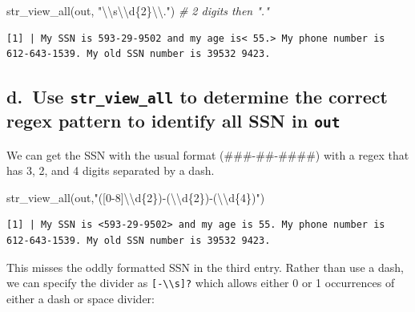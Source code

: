 \documentclass[
]{book}
\newenvironment{Shaded}{\begin{snugshade}}{\end{snugshade}}
\newcommand{\CommentTok}[1]{\textcolor[rgb]{0.56,0.35,0.01}{\textit{#1}}}
\newcommand{\FunctionTok}[1]{\textcolor[rgb]{0.00,0.00,0.00}{#1}}
\newcommand{\NormalTok}[1]{#1}
\newcommand{\SpecialCharTok}[1]{\textcolor[rgb]{0.00,0.00,0.00}{#1}}
\newcommand{\StringTok}[1]{\textcolor[rgb]{0.31,0.60,0.02}{#1}}
\begin{document}
\begin{Shaded}
\begin{Highlighting}[]
\FunctionTok{str\_view\_all}\NormalTok{(out, }\StringTok{"}\SpecialCharTok{\textbackslash{}\textbackslash{}}\StringTok{s}\SpecialCharTok{\textbackslash{}\textbackslash{}}\StringTok{d\{2\}}\SpecialCharTok{\textbackslash{}\textbackslash{}}\StringTok{."}\NormalTok{)  }\CommentTok{\# 2 digits then "."}
\end{Highlighting}
\end{Shaded}

\begin{verbatim}
[1] | My SSN is 593-29-9502 and my age is< 55.> My phone number is 612-643-1539. My old SSN number is 39532 9423.
\end{verbatim}

\hypertarget{d.-use-str_view_all-to-determine-the-correct-regex-pattern-to-identify-all-ssn-in-out}{%
\subsection{\texorpdfstring{d.~Use \texttt{str\_view\_all} to determine the correct regex pattern to identify all SSN in \texttt{out}}{d.~Use str\_view\_all to determine the correct regex pattern to identify all SSN in out}}\label{d.-use-str_view_all-to-determine-the-correct-regex-pattern-to-identify-all-ssn-in-out}}

We can get the SSN with the usual format (\#\#\#-\#\#-\#\#\#\#) with a regex that has 3, 2, and 4 digits separated by a dash.

\begin{Shaded}
\begin{Highlighting}[]
\FunctionTok{str\_view\_all}\NormalTok{(out,}\StringTok{"([0{-}8]}\SpecialCharTok{\textbackslash{}\textbackslash{}}\StringTok{d\{2\}){-}(}\SpecialCharTok{\textbackslash{}\textbackslash{}}\StringTok{d\{2\}){-}(}\SpecialCharTok{\textbackslash{}\textbackslash{}}\StringTok{d\{4\})"}\NormalTok{)}
\end{Highlighting}
\end{Shaded}

\begin{verbatim}
[1] | My SSN is <593-29-9502> and my age is 55. My phone number is 612-643-1539. My old SSN number is 39532 9423.
\end{verbatim}

This misses the oddly formatted SSN in the third entry. Rather than use a dash, we can specify the divider as \texttt{{[}-\textbackslash{}\textbackslash{}s{]}?} which allows either 0 or 1 occurrences of either a dash or space divider:
\end{document}
